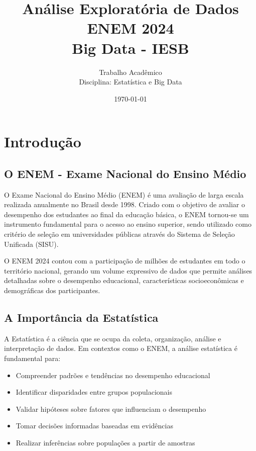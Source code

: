 \documentclass[12pt,a4paper]{article}
\title{
    \textbf{Análise Exploratória de Dados} \\
    \textbf{ENEM 2024} \\
    \large Big Data - IESB
}
\author{
    Trabalho Acadêmico \\
    Disciplina: Estatística e Big Data
}
\date{\today}
\begin{document}
\maketitle
\thispagestyle{empty}
\newpage

\tableofcontents
\newpage

\section{Introdução}

\subsection{O ENEM - Exame Nacional do Ensino Médio}

O Exame Nacional do Ensino Médio (ENEM) é uma avaliação de larga escala realizada anualmente no Brasil desde 1998. Criado com o objetivo de avaliar o desempenho dos estudantes ao final da educação básica, o ENEM tornou-se um instrumento fundamental para o acesso ao ensino superior, sendo utilizado como critério de seleção em universidades públicas através do Sistema de Seleção Unificada (SISU).

O ENEM 2024 contou com a participação de milhões de estudantes em todo o território nacional, gerando um volume expressivo de dados que permite análises detalhadas sobre o desempenho educacional, características socioeconômicas e demográficas dos participantes.

\subsection{A Importância da Estatística}

A Estatística é a ciência que se ocupa da coleta, organização, análise e interpretação de dados. Em contextos como o ENEM, a análise estatística é fundamental para:

\begin{itemize}
    \item Compreender padrões e tendências no desempenho educacional
    \item Identificar disparidades entre grupos populacionais
    \item Validar hipóteses sobre fatores que influenciam o desempenho
    \item Tomar decisões informadas baseadas em evidências
    \item Realizar inferências sobre populações a partir de amostras
\end{itemize}
\end{document}
